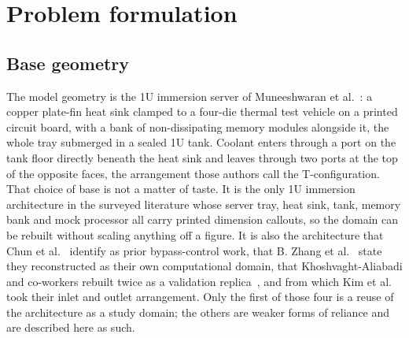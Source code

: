 %

\section{Problem formulation}
\label{sec:formulation}

\subsection{Base geometry}
\label{sec:geometry}

The model geometry is the 1U immersion server of Muneeshwaran et al.~\cite{muneeshwaran2023}:
a copper plate-fin heat sink clamped to a four-die thermal test vehicle on a printed circuit
board, with a bank of non-dissipating memory modules alongside it, the whole tray submerged in a
sealed 1U tank. Coolant enters through a port on the tank floor directly beneath the heat sink
and leaves through two ports at the top of the opposite faces, the arrangement those authors call
the T-configuration. That choice of base is not a matter of taste. It is the only 1U immersion
architecture in the surveyed literature whose server tray, heat sink, tank, memory bank and mock
processor all carry printed dimension callouts, so the domain can be rebuilt without scaling
anything off a figure. It is also the architecture that Chun et al.~\cite{chun2026} identify as
prior bypass-control work, that B. Zhang et al.~\cite{zhang2026} state they reconstructed as their
own computational domain, that Khoshvaght-Aliabadi and co-workers rebuilt twice as a validation
replica~\cite{khoshvaghtaliabadi2026oblique,khoshvaghtaliabadi2026component}, and from which Kim
et al.~\cite{kim2025} took their inlet and outlet arrangement. Only the first of those four is a
reuse of the architecture as a study domain; the others are weaker forms of reliance and are
described here as such.

